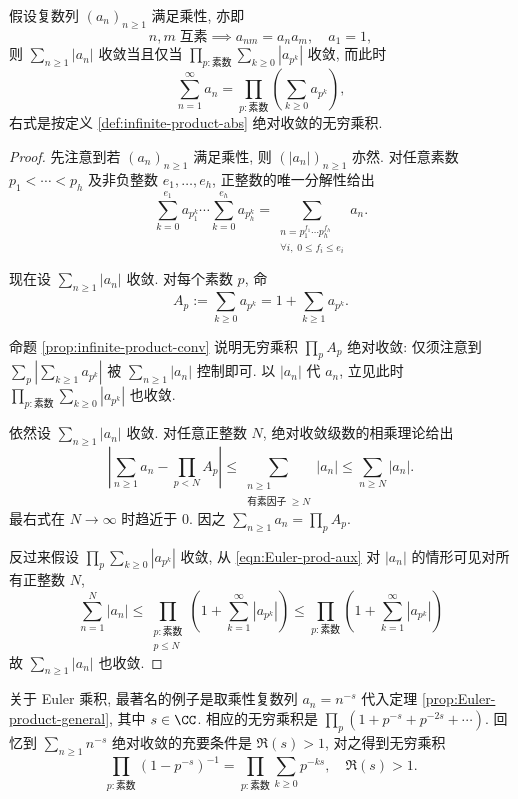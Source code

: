 \begin{theorem}[Euler 乘积]\label{prop:Euler-product-general} 
	假设复数列 $(a_n)_{n \geq 1}$ 满足乘性, 亦即
	\[ n, m \;\text{互素} \implies a_{nm} = a_n a_m, \quad a_1 = 1, \]
	则 $\sum_{n \geq 1} |a_n|$ 收敛当且仅当 $\prod_{p: \text{素数}} \sum_{k \geq 0} |a_{p^k}|$ 收敛, 而此时
	\[ \sum_{n=1}^\infty a_n =  \prod_{p: \text{素数}} \left( \sum_{k \geq 0} a_{p^k} \right), \]
	右式是按定义 \ref{def:infinite-product-abs} 绝对收敛的无穷乘积.
\end{theorem}
\begin{proof}
	先注意到若 $(a_n)_{n \geq 1}$ 满足乘性, 则 $(|a_n|)_{n \geq 1}$ 亦然. 对任意素数 $p_1 < \cdots < p_h$ 及非负整数 $e_1, \ldots, e_h$, 正整数的唯一分解性给出
	\begin{equation}\label{eqn:Euler-prod-aux}
		\sum_{k=0}^{e_1} a_{p_1^k} \cdots \sum_{k=0}^{e_h} a_{p_h^k}
		= \sum_{\substack{n = p_1^{f_1} \cdots p_h^{f_h} \\ \forall i,\; 0 \leq f_i \leq e_i }} a_n.
	\end{equation}
	
	现在设 $\sum_{n \geq 1} |a_n|$ 收敛. 对每个素数 $p$, 命
	\[ A_p := \sum_{k \geq 0} a_{p^k} = 1 + \sum_{k \geq 1} a_{p^k}. \]
	
	命题 \ref{prop:infinite-product-conv} 说明无穷乘积 $\prod_p A_p$ 绝对收敛: 仅须注意到 $\sum_p \left| \sum_{k \geq 1} a_{p^k} \right|$ 被 $\sum_{n \geq 1} |a_n|$ 控制即可. 以 $|a_n|$ 代 $a_n$, 立见此时 $\prod_{p: \text{素数}} \sum_{k \geq 0} |a_{p^k}|$ 也收敛.

	依然设 $\sum_{n \geq 1} |a_n|$ 收敛. 对任意正整数 $N$, 绝对收敛级数的相乘理论给出
	\[ \left| \sum_{n \geq 1} a_n - \prod_{p < N} A_p \right| \leq \sum_{\substack{n \geq 1 \\ \text{有素因子}\; \geq N}} |a_n| \leq \sum_{n \geq N} |a_n|. \]
	最右式在 $N \to \infty$ 时趋近于 $0$. 因之 $\sum_{n \geq 1} a_n = \prod_p A_p$.
	
	反过来假设 $\prod_p \sum_{k \geq 0} |a_{p^k}|$ 收敛, 从 \eqref{eqn:Euler-prod-aux} 对 $|a_n|$ 的情形可见对所有正整数 $N$,
	\[ \sum_{n=1}^N |a_n| \leq \prod_{\substack{p: \text{素数} \\ p \leq N}} \left( 1 + \sum_{k=1}^\infty |a_{p^k}| \right) \leq \prod_{p: \text{素数}} \left( 1 + \sum_{k=1}^\infty |a_{p^k}| \right) \]
	故 $\sum_{n \geq 1} |a_n|$ 也收敛.
\end{proof}

关于 Euler 乘积, 最著名的例子是取乘性复数列 $a_n = n^{-s}$ 代入定理 \ref{prop:Euler-product-general}, 其中 $s \in \CC$. 相应的无穷乘积是 $\prod_p (1 + p^{-s} + p^{-2s} + \cdots)$. 回忆到 $\sum_{n \geq 1} n^{-s}$ 绝对收敛的充要条件是 $\Re(s) > 1$, 对之得到无穷乘积
\[ \prod_{p: \text{素数}} \left( 1 - p^{-s} \right)^{-1} = \prod_{p: \text{素数}} \sum_{k \geq 0} p^{-ks}, \quad \Re(s) > 1. \]

